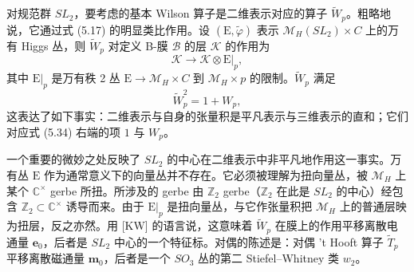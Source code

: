 对规范群 $SL_2$，要考虑的基本 Wilson 算子是二维表示对应的算子 $\widetilde{W}_p$。粗略地说，它通过式 (5.17) 的明显类比作用。设 $(\mathrm{E},\widetilde{\varphi})$ 表示 $\mathcal{M}_H(SL_2)\times C$ 上的万有 Higgs 丛，则 $\widetilde{W}_p$ 对定义 B-膜 $\mathcal{B}$ 的层 $\mathcal{K}$ 的作用为
\begin{equation}\tag{5.33}
\mathcal{K}\to\mathcal{K}\otimes\mathrm{E}|_p,
\end{equation}
其中 $\mathrm{E}|_p$ 是万有秩 2 丛 $\mathrm{E}\to\mathcal{M}_H\times C$ 到 $\mathcal{M}_H\times p$ 的限制。$\widetilde{W}_p$ 满足
\begin{equation}\tag{5.34}
\widetilde{W}_p^2=1+W_p,
\end{equation}
这表达了如下事实：二维表示与自身的张量积是平凡表示与三维表示的直和；它们对应式 (5.34) 右端的项 $1$ 与 $W_p$。

一个重要的微妙之处反映了 $SL_2$ 的中心在二维表示中非平凡地作用这一事实。万有丛 $\mathrm{E}$ 作为通常意义下的向量丛并不存在。它必须被理解为扭向量丛，被 $\mathcal{M}_H$ 上某个 $\mathbb{C}^\times$ gerbe 所扭。所涉及的 gerbe 由 $\mathbb{Z}_2$ gerbe（$\mathbb{Z}_2$ 在此是 $SL_2$ 的中心）经包含 $\mathbb{Z}_2\subset\mathbb{C}^\times$ 诱导而来。由于 $\mathrm{E}|_p$ 是扭向量丛，与它作张量积把 $\mathcal{M}_H$ 上的普通层映为扭层，反之亦然。用 [KW] 的语言说，这意味着 $\widetilde{W}_p$ 在膜上的作用平移离散电通量 $\boldsymbol{e}_0$，后者是 $SL_2$ 中心的一个特征标。对偶的陈述是：对偶 't Hooft 算子 $\widetilde{T}_p$ 平移离散磁通量 $\boldsymbol{m}_0$，后者是一个 $SO_3$ 丛的第二 Stiefel--Whitney 类 $w_2$。


